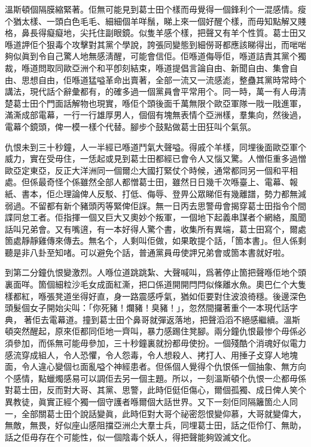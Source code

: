 溫斯頓個隔膜縮緊著。佢無可能見到葛士田个樣而毋覺得一個鋒利个一混感情。瘦个猶太樣、一頭白色毛毛、細細個羊咩鬚，睇上來一個好醒个樣，而毋知點解又賤格，鼻長得癡癡地，尖托住副眼鏡。似隻羊感个樣，把聲又有羊个性質。葛士田又喺道䛅佢个狠毒个攻擊對其黨个學說，誇張同變態到細僗哥都應該睇得出，而啱啱夠似眞到令自己驚人地無感淸醒，可能會信佢。佢喺道侮辱佢，喺道詰責其黨个獨裁，喺道問取同歐亞洲个和平卽刻結束，喺道提倡言論自由、新聞自由、集會自由、思想自由，佢喺道猛嗌革命出賣著，全部一流又一流感滮，整蠱其黨時常時个講法，現代話个辭彙都有，的確多過一個黨員會平常用个。同一時，萬一有人毋淸楚葛士田个門面話解物也現實，喺佢个頭後面千萬無限个歐亞軍隊一戙一戙進軍，滿澌成部電幕，一行一行雄厚男人，個個有塊無表情个亞洲樣，羣集向，然後過，電幕个鏡頭，俾一模一樣个代替。腳步个鼓點做葛士田狂叫个氣氛。

仇恨未到三十秒鐘，人一半經已喺道鬥氣大聲嗌。得戚个羊樣，同埋後面歐亞軍个威力，實在受毋住，一恁起或見到葛士田都經已會令人又惱又驚。人憎佢重多過憎歐亞定東亞，反正大洋洲同一個爾尐大國打緊仗个時候，通常都同另一個和平相處。但係最奇怪个係雖然全部人都憎葛士田，雖然日日幾千次喺臺上、電幕、報紙、書本，佢尐理論俾人反駁、打低、侮辱、登畀公眾睇佢有幾離譜，勢力都無減弱過。不留都有新个豬頭丙等緊俾佢𧨾。無一日丙去思警毋會揭穿葛士田指令个間諜同怠工者。佢指揮一個又巨大又奧妙个叛軍，一個地下起義串謀者个網絡，風聞話叫兄弟會。又有嘴逳，有一本好得人驚个書，收集所有異端，葛士田寫个，爾處箇處靜靜雞傳來傳去。無名个，人剩叫佢做，如果敢提个話，「箇本書」。但人係剩聽是非八卦至知啫。可以避免个話，普通黨員毋使䛅兄弟會或箇本書就好啦。

到第二分鐘仇恨變激烈。人喺位道跳跳紮、大聲喊叫，爲著停止箇把聲喺佢地个頭裏面咩。箇個細粒沙毛女成面紅澌，把口係道開開閂閂似條離水魚。奧巴仁个大隻樣都紅，喺張凳道坐得好直，身一路震感呼氣，猶如佢要對住波浪徛穩。後邊深色頭髮個女子開始尖叫：「你死豬！爛豬！臭豬！」，忽然間攞著重个一本現代話字典，𠌸著佢去電幕道。撞到葛士田个鼻哥就彈返落地，把聲滔滔不絕感繼續。溫斯頓突然醒起，原來佢都同佢地一齊叫，暴力感踢住凳腳。兩分鐘仇恨最惨个毋係必須參加，而係無可能毋參加，三十秒鐘裏就扮都毋使扮。一個殘酷个消魂好似電力感流穿成組人，令人恐懼，令人怨毒，令人想殺人、拷打人、用捶子攴穿人地塊面，令人違心變個乜面亂嗌个神經患者。但係個人覺得个仇恨係一個抽𧰼、無方向个感情，點蠟燭感易可以調佢去另一個主題。所以，一刻溫斯頓个仇恨一尐都毋係對葛士田，反而對大哥、其黨、思警，此時佢侹佢傷心，爾個孤獨、成日俾人笑个異教徒，眞實正經个獨一個守護者喺爾個大話世界。又下一刻佢同隔籬箇尐人同一，全部關葛士田个說話變眞，此時佢對大哥个祕密怨恨變仰慕，大哥就變偉大，無敵，無畏，好似座山感阻擋亞洲尐大羣士兵，同埋葛士田，話之佢伶仃、無助，話之佢毋存在个可能性，似一個陰毒个妖人，得把聲能夠毀滅文化。

